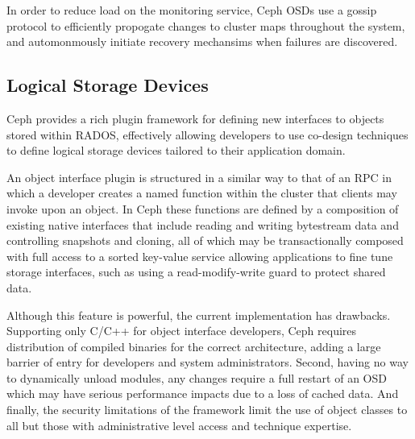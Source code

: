 \documentclass[10pt,twocolumn]{article}
\begin{document}
In order to reduce load on the monitoring service, Ceph OSDs use a gossip
protocol to efficiently propogate changes to cluster maps throughout the
system, and automonmously initiate recovery mechansims when failures are
discovered.

\subsection{Logical Storage Devices}
\label{active-storage}

Ceph provides a rich plugin framework for defining new interfaces to objects
stored within RADOS, effectively allowing developers to use co-design
techniques to define logical storage devices tailored to their application
domain.

An object interface plugin is structured in a similar way to that of an RPC in
which a developer creates a named function within the cluster that clients may
invoke upon an object. In Ceph these functions are defined by a composition of
existing native interfaces that include reading and writing bytestream data
and controlling snapshots and cloning, all of which may be transactionally
composed with full access to a sorted key-value service allowing applications
to fine tune storage interfaces, such as using a read-modify-write guard to
protect shared data.

Although this feature is powerful, the current implementation has drawbacks.
Supporting only C/C++ for object interface developers, Ceph requires
distribution of compiled binaries for the correct architecture, adding a
large barrier of entry for developers and system administrators. Second,
having no way to dynamically unload modules, any changes require a full
restart of an OSD which may have serious performance impacts due to a loss
of cached data. And finally, the security limitations of the framework
limit the use of object classes to all but those with administrative level
access and technique expertise.
\end{document}
